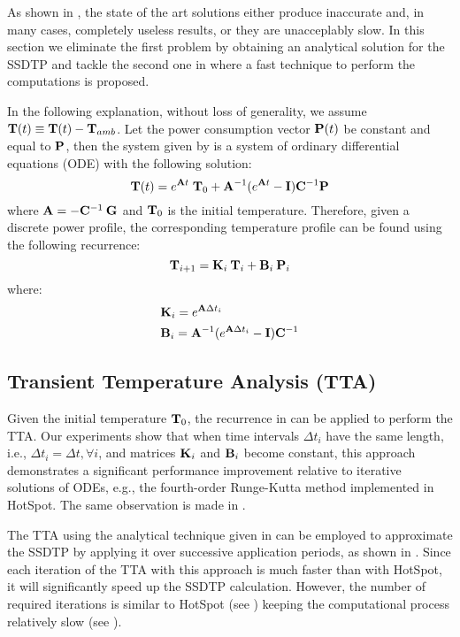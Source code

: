 As shown in , the state of the art solutions either produce inaccurate and, in many cases, completely useless results, or they are unacceplably slow. In this section we eliminate the first problem by obtaining an analytical solution for the SSDTP and tackle the second one in  where a fast technique to perform the computations is proposed.

In the following explanation, without loss of generality, we assume $\mathbf{T}(t) \equiv \mathbf{T}(t) - \mathbf{T}_{amb}$. Let the power consumption vector $\mathbf{P}(t)$ be constant and equal to $\mathbf{P}$, then the system given by  is a system of ordinary differential equations (ODE) with the following solution:
\begin{equation} \label{eq:solution}
  \mathbf{T}(t) = e^{\mathbf{A} t} \; \mathbf{T}_0 + \mathbf{A}^{-1}(e^{\mathbf{A} t} - \mathbf{I})\mathbf{C}^{-1} \mathbf{P}
\end{equation}
where $\mathbf{A} = -\mathbf{C}^{-1} \: \mathbf{G}$ and $\mathbf{T}_0$ is the initial temperature. Therefore, given a discrete power profile, the corresponding temperature profile can be found using the following recurrence:
\begin{equation} \label{eq:recurrent-system}
  \mathbf{T}_{i+1} = \mathbf{K}_i \: \mathbf{T}_i + \mathbf{B}_i \: \mathbf{P}_i
\end{equation}
where:
\begin{align*}
  & \mathbf{K}_i = e^{\mathbf{A} \Delta t_i} \\
  & \mathbf{B}_i = \mathbf{A}^{-1}(e^{\mathbf{A} \Delta t_i} - \mathbf{I})\mathbf{C}^{-1}
\end{align*}

\subsection{Transient Temperature Analysis (TTA)} \label{sec:tta-analytical}
Given the initial temperature $\mathbf{T}_0$, the recurrence in  can be applied to perform the TTA. Our experiments show that when time intervals $\Delta t_i$ have the same length, i.e., $\Delta t_i = \Delta t, \forall i$, and matrices $\mathbf{K}_i$ and $\mathbf{B}_i$ become constant, this approach demonstrates a significant performance improvement relative to iterative solutions of ODEs, e.g., the fourth-order Runge-Kutta method implemented in HotSpot. The same observation is made in \cite{thiele2011}.

The TTA using the analytical technique given in  can be employed to approximate the SSDTP by applying it over successive application periods, as shown in . Since each iteration of the TTA with this approach is much faster than with HotSpot, it will significantly speed up the SSDTP calculation. However, the number of required iterations is similar to HotSpot (see ) keeping the computational process relatively slow (see ).

